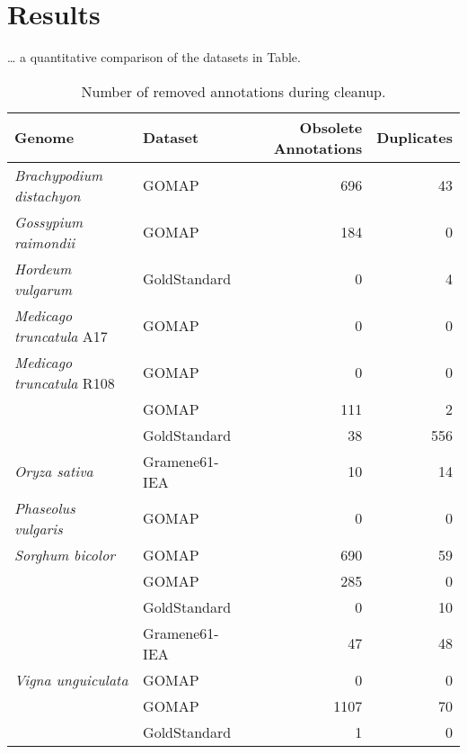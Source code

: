 \documentclass[utf8]{frontiersSCNS}
\begin{document}
\hypertarget{results}{%
\section{Results}\label{results}}

\ldots{} a quantitative comparison of the datasets in Table.

\begin{table}[t]

\caption{\label{tab:cleanup-table}Number of removed annotations during cleanup.}
\centering
\begin{tabular}{llrr}
\toprule
Genome & Dataset & Obsolete Annotations & Duplicates\\
\midrule
\rowcolor{gray!6}  \textit{Brachypodium distachyon} & GOMAP & 696 & 43\\
\cmidrule{1-4}
\textit{Gossypium raimondii} & GOMAP & 184 & 0\\
\cmidrule{1-4}
\rowcolor{gray!6}  \textit{Hordeum vulgarum} & GoldStandard & 0 & 4\\
\cmidrule{1-4}
\textit{Medicago truncatula} A17 & GOMAP & 0 & 0\\
\cmidrule{1-4}
\rowcolor{gray!6}  \textit{Medicago truncatula} R108 & GOMAP & 0 & 0\\
\cmidrule{1-4}
 & GOMAP & 111 & 2\\

\rowcolor{gray!6}   & GoldStandard & 38 & 556\\

\multirow{-3}{*}{\raggedright\arraybackslash \textit{Oryza sativa}} & Gramene61-IEA & 10 & 14\\
\cmidrule{1-4}
\rowcolor{gray!6}  \textit{Phaseolus vulgaris} & GOMAP & 0 & 0\\
\cmidrule{1-4}
\textit{Sorghum bicolor} & GOMAP & 690 & 59\\
\cmidrule{1-4}
\rowcolor{gray!6}   & GOMAP & 285 & 0\\

 & GoldStandard & 0 & 10\\

\rowcolor{gray!6}  \multirow{-3}{*}{\raggedright\arraybackslash \textit{Triticum aestivum}} & Gramene61-IEA & 47 & 48\\
\cmidrule{1-4}
\textit{Vigna unguiculata} & GOMAP & 0 & 0\\
\cmidrule{1-4}
\rowcolor{gray!6}   & GOMAP & 1107 & 70\\

 & GoldStandard & 1 & 0\\


\end{tabular}
\end{table}
\end{document}
